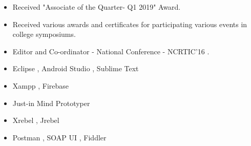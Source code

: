 

{}



\smallskip
\smallskip
\smallskip
{}
\smallskip
\smallskip
\smallskip
{}

\begin{itemize}
    \item Received "Associate of the Quarter- Q1 2019" Award.
    \item Received various awards and certificates for participating various events in college symposiums.
    \item Editor and Co-ordinator - National Conference - NCRTIC'16 .
\end{itemize}

\begin{itemize}
    \item Eclipse , Android Studio , Sublime Text
    \item Xampp , Firebase
    \item Just-in Mind Prototyper 
    \item Xrebel , Jrebel
    \item Postman , SOAP UI , Fiddler
    
\end{itemize}

\iffalse
\cvsection{Hobbies}
\begin{itemize}
    \item Watching movies.
    \item Listening songs.
    \item Playing games .
\end{itemize}
\fi


